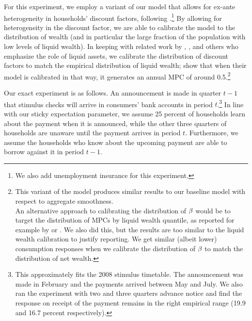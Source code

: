 \documentclass[titlepage]{./econtex}
\begin{document}
For this experiment, we employ a variant of our model that allows for ex-ante heterogeneity in households' discount factors, following \cite{cstwMPC}.\footnote{We also add unemployment insurance for this experiment.} By allowing for heterogeneity in the discount factor, we are able to calibrate the model to the distribution of wealth (and in particular the large fraction of the population with low levels of liquid wealth).  In keeping with related work by \cite{kvwWealthyH2m}, \cite{kmvHANK}, and others who emphasize the role of liquid assets, we calibrate the distribution of discount factors to match the empirical distribution of liquid wealth; \cite{cstwMPC} show that when their model is calibrated in that way, it generates an annual MPC of around 0.5.\footnote{This variant of the model produces similar results to our baseline model with respect to aggregate smoothness.\\
An alternative approach to calibrating the distribution of $\beta$ would be to target the distribution of MPCs by liquid wealth quantile, as reported for example by \cite{fhnMPC} or \cite{ckConsumption}. We also did this, but the results are too similar to the liquid wealth calibration to justify reporting.  We get similar (albeit lower) consumption responses when we calibrate the distribution of $\beta$ to match the distribution of net wealth.}

Our exact experiment is as follows.  An announcement is made in quarter $t-1$ that stimulus checks will arrive in consumers' bank accounts in period $t$.\footnote{This approximately fits the 2008 stimulus timetable. The announcement was made in February and the payments arrived between May and July. We also ran the experiment with two and three quarters advance notice and find the response on receipt of the payment remains in the right empirical range (19.9 and 16.7 percent respectively).} In line with our sticky expectation parameter, we assume 25 percent of households learn about the payment when it is announced, while the other three quarters of households are unaware until the payment arrives in period $t$. Furthermore, we assume the households who know about the upcoming payment are able to borrow against it in period $t-1$.
\end{document}
